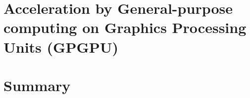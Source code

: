 \section[Acceleration by GPGPU]{Acceleration by General-purpose
computing on Graphics Processing Units (GPGPU)}
%
%
\section{Summary}

